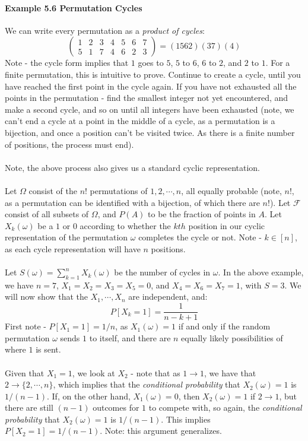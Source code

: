\documentclass[12pt,a4paper]{article}
\newcommand{\1}[1]{\mathbbm{1}\left\{ #1 \right\}}
\newcommand{\fcal}{\mathcal{F}}
\begin{document}
\paragraph{Example 5.6 Permutation Cycles} We can write every permutation as a \textit{product of cycles}:
$$
	\begin{pmatrix}
	1 & 2 & 3 & 4 & 5 & 6 & 7\\
	5 & 1 & 7 & 4 & 6 & 2 & 3
	\end{pmatrix}
	=
	(1562)(37)(4)
$$
Note - the cycle form implies that $1$ goes to $5$, $5$ to $6$, $6$ to $2$, and $2$ to $1$. For a finite permutation, this is intuitive to prove. Continue to create a cycle, until you have reached the first point in the cycle again. If you have not exhausted all the points in the permutation - find the smallest integer not yet encountered, and make a second cycle, and so on until all integers have been exhausted (note, we can't end a cycle at a point in the middle of a cycle, as a permutation is a bijection, and once a position can't be visited twice. As there is a finite number of positions, the process must end).
\\\\
Note, the above process also gives us a standard cyclic representation.
\\\\
Let $\Omega$ consist of the $n!$ permutations of $1,2,\cdots,n$, all equally probable (note, $n!$, as a permutation can be identified with a bijection, of which there are $n!$). Let $\fcal$ consist of all subsets of $\Omega$, and $P(A)$ to be the fraction of points in $A$. Let $X_k(\omega)$ be a $1$ or $0$ according to whether the $kth$ position in our cyclic representation of the permutation $\omega$ completes the cycle or not. Note - $k \in [n]$, as each cycle representation will have $n$ positions.
\\\\
Let $S(\omega) = \sum_{k=1}^n X_k(\omega)$ be the number of cycles in $\omega$. In the above example, we have $n = 7$, $X_1 = X_2 = X_3 = X_5 = 0$, and $X_4 = X_6 = X_7 = 1$, with $S = 3$. We will now show that the $X_1, \cdots, X_n$ are independent, and:
$$
	P[X_k = 1] = \frac{1}{n - k + 1}
$$
First note - $P[X_1 = 1] = 1/n$, as $X_1(\omega) = 1$ if and only if the random permutation $\omega$ sends $1$ to itself, and there are $n$ equally likely possibilities of where $1$ is sent.
\\\\
Given that $X_1 = 1$, we look at $X_2$ - note that as $1 \to 1$, we have that $2 \to \{2, \cdots, n\}$, which implies that the \textit{conditional probability} that $X_2(\omega) = 1$ is $1/(n-1)$. If, on the other hand, $X_1(\omega) = 0$, then $X_2(\omega) = 1$ if $2 \to 1$, but there are still $(n-1)$ outcomes for $1$ to compete with, so again, the \textit{conditional probability} that $X_2(\omega) = 1$ is $1/(n-1)$. This implies $P[X_2 = 1] = 1/(n-1)$. Note: this argument generalizes.
\end{document}

